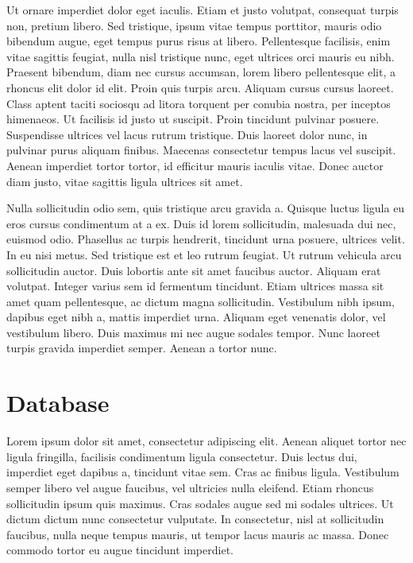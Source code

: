 \documentclass[letterpaper,10pt,english]{sphinxmanual}
\begin{document}
Ut ornare imperdiet dolor eget iaculis. Etiam et justo volutpat, consequat turpis non, pretium libero. Sed tristique, ipsum vitae tempus porttitor, mauris odio bibendum augue, eget tempus purus risus at libero. Pellentesque facilisis, enim vitae sagittis feugiat, nulla nisl tristique nunc, eget ultrices orci mauris eu nibh. Praesent bibendum, diam nec cursus accumsan, lorem libero pellentesque elit, a rhoncus elit dolor id elit. Proin quis turpis arcu. Aliquam cursus cursus laoreet. Class aptent taciti sociosqu ad litora torquent per conubia nostra, per inceptos himenaeos. Ut facilisis id justo ut suscipit. Proin tincidunt pulvinar posuere. Suspendisse ultrices vel lacus rutrum tristique. Duis laoreet dolor nunc, in pulvinar purus aliquam finibus. Maecenas consectetur tempus lacus vel suscipit. Aenean imperdiet tortor tortor, id efficitur mauris iaculis vitae. Donec auctor diam justo, vitae sagittis ligula ultrices sit amet.

Nulla sollicitudin odio sem, quis tristique arcu gravida a. Quisque luctus ligula eu eros cursus condimentum at a ex. Duis id lorem sollicitudin, malesuada dui nec, euismod odio. Phasellus ac turpis hendrerit, tincidunt urna posuere, ultrices velit. In eu nisi metus. Sed tristique est et leo rutrum feugiat. Ut rutrum vehicula arcu sollicitudin auctor. Duis lobortis ante sit amet faucibus auctor. Aliquam erat volutpat. Integer varius sem id fermentum tincidunt. Etiam ultrices massa sit amet quam pellentesque, ac dictum magna sollicitudin. Vestibulum nibh ipsum, dapibus eget nibh a, mattis imperdiet urna. Aliquam eget venenatis dolor, vel vestibulum libero. Duis maximus mi nec augue sodales tempor. Nunc laoreet turpis gravida imperdiet semper. Aenean a tortor nunc.


\chapter{Database}
\label{database::doc}\label{database:database}
Lorem ipsum dolor sit amet, consectetur adipiscing elit. Aenean aliquet tortor nec ligula fringilla, facilisis condimentum ligula consectetur. Duis lectus dui, imperdiet eget dapibus a, tincidunt vitae sem. Cras ac finibus ligula. Vestibulum semper libero vel augue faucibus, vel ultricies nulla eleifend. Etiam rhoncus sollicitudin ipsum quis maximus. Cras sodales augue sed mi sodales ultrices. Ut dictum dictum nunc consectetur vulputate. In consectetur, nisl at sollicitudin faucibus, nulla neque tempus mauris, ut tempor lacus mauris ac massa. Donec commodo tortor eu augue tincidunt imperdiet.
\end{document}

